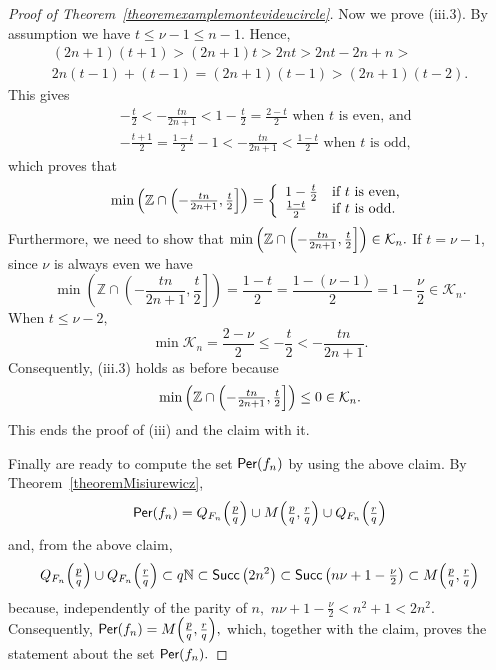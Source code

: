 \documentclass[a4paper, 11pt]{amsart}
\numberwithin{equation}{section}
\theoremstyle{customnumberedtheorem}
\theoremstyle{definitionwithbfnote}
\newcommand{\N}{\ensuremath{\mathbb{N}}}
\newcommand{\Z}{\ensuremath{\mathbb{Z}}}
\DeclareMathOperator{\Per}{\textsf{\upshape Per}}
\DeclareMathOperator{\Succ}{\textsf{\upshape Succ}}
\newcommand{\succs}[1]{\ensuremath{\Succ\left(#1\right)}}
\begin{document}
\begin{proof}[Proof of Theorem~\ref{theoremexamplemontevideucircle}]
Now we prove (iii.3).
By assumption we have $t \le \nu - 1 \le  n-1.$
Hence,
\begin{multline*}
 (2n+1)(t+1) > (2n+1)t > 2nt > 2nt - 2n + n >\\
        2n(t-1) + (t-1) = (2n+1)(t-1) > (2n+1)(t-2).
\end{multline*}
This gives
\begin{align*}
 & -\frac{t}{2} < -\frac{tn}{2n+1} < 1- \frac{t}{2} = \frac{2-t}{2} \text{ when $t$ is even, and}\\
 & -\frac{t+1}{2} = \frac{1-t}{2} - 1 < -\frac{tn}{2n+1} < \frac{1-t}{2} \text{ when $t$ is odd,}
\end{align*}
which proves that
\[
 \min \left( \Z \cap \Bigl(-\tfrac{tn}{2n+1},\tfrac{t}{2}\Bigr]\right) =
 \left\{\begin{array}{ll}
  1-\tfrac{t}{2} & \text{if $t$ is even,}\\
  \tfrac{1-t}{2} & \text{if $t$ is odd.}
 \end{array}\right.
\]
Furthermore, we need to show that
$\min \left( \Z \cap \Bigl(-\tfrac{tn}{2n+1},\tfrac{t}{2}\Bigr]\right) \in \mathcal{K}_n.$
If $t = \nu - 1$, since $\nu$ is always even we have
\[
 \min \left( \Z \cap \left(-\frac{tn}{2n+1},\frac{t}{2}\right]\right) =
 \frac{1-t}{2} = \frac{1-(\nu-1)}{2} = 1- \frac{\nu}{2} %
 \in \mathcal{K}_n.
\]
When $t \le \nu -2,$
\[
 \min \mathcal{K}_n = \frac{2-\nu}{2} \le -\frac{t}{2} < -\frac{tn}{2n+1}.
\]
Consequently, (iii.3) holds as before because
\[
   \min \left( \Z \cap \Bigl(-\tfrac{tn}{2n+1},\tfrac{t}{2}\Bigr]\right) \le 0 \in \mathcal{K}_n.
\]
This ends the proof of (iii) and the claim with it.

Finally are ready to compute the set $\Per(f_{n})$ by using the above claim.
By Theorem~\ref{theoremMisiurewicz},
\[
 \Per(f_{n}) = Q_{F_n}\Bigl(\tfrac{p}{q}\Bigr) \cup M\Bigl(\tfrac{p}{q}, \tfrac{r}{q}\Bigr) \cup Q_{F_n}\Bigl(\tfrac{r}{q}\Bigr)
\]
and, from the above claim,
\[
  Q_{F_n}\Bigl(\tfrac{p}{q}\Bigr) \cup Q_{F_n}\Bigl(\tfrac{r}{q}\Bigr)
     \subset q\N \subset \succs{2n^2} \subset \succs{n\nu+1-\tfrac{\nu}{2}}
     \subset M\Bigl(\tfrac{p}{q}, \tfrac{r}{q}\Bigr)
\]
because, independently of the parity of $n,$
$n\nu+1-\tfrac{\nu}{2} < n^2 + 1 < 2n^2.$
Consequently, $\Per(f_{n}) = M\Bigl(\tfrac{p}{q}, \tfrac{r}{q}\Bigr),$
which, together with the claim, proves the statement about the set
$\Per(f_{n}).$


\end{proof}
\end{document}
